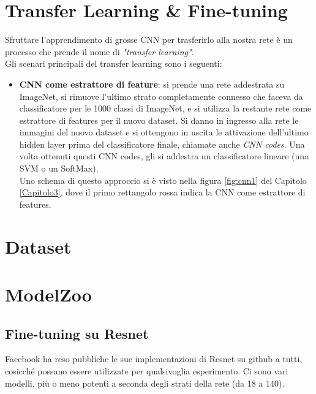 \section{Transfer Learning & Fine-tuning}
Sfruttare l'apprendimento di grosse CNN per trasferirlo alla nostra rete è un processo che prende il nome di \emph{"transfer learning"}. \\
Gli scenari principali del transfer learning sono i seguenti: 
\begin{itemize}	
\item \textbf{CNN come estrattore di feature}: si prende una rete addestrata su ImageNet, si rimuove l'ultimo strato completamente connesso che faceva da classificatore per le 1000 classi di ImageNet, e si utilizza la restante rete come estrattore di features per il nuovo dataset. Si danno in ingresso alla rete le immagini del nuovo dataset e si ottengono in uscita le attivazione dell'ultimo hidden layer prima del classificatore finale, chiamate anche \emph{CNN codes}. Una volta ottenuti questi CNN codes, gli si addestra un classificatore lineare (una SVM o un SoftMax).
\\
Uno schema di questo approccio si è visto nella figura \ref{fig:cnn1} del Capitolo \ref{Capitolo3}, dove il primo rettangolo rossa indica la CNN come estrattore di features. 
\end{itemize}
\parencite{Wzoo}


\section{Dataset}







\section{ModelZoo}

\subsection{Fine-tuning su Resnet}
Facebook ha reso pubbliche le sue implementazioni di Resnet su github a tutti, cosicché possano essere utilizzate per qualsivoglia esperimento. Ci sono vari modelli, più o meno potenti a seconda degli strati della rete (da 18 a 140). 

